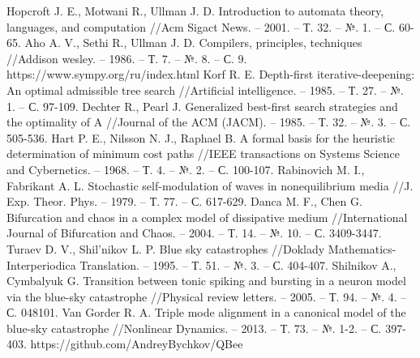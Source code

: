 \documentclass[a4paper,14pt]{article}
\begin{document}
\begin{thebibliography}{9}
 Hopcroft J. E., Motwani R., Ullman J. D. Introduction to automata theory, languages, and computation //Acm Sigact News. – 2001. – Т. 32. – №. 1. – С. 60-65.
 Aho A. V., Sethi R., Ullman J. D. Compilers, principles, techniques //Addison wesley. – 1986. – Т. 7. – №. 8. – С. 9.
 https://www.sympy.org/ru/index.html
 Korf R. E. Depth-first iterative-deepening: An optimal admissible tree search //Artificial intelligence. – 1985. – Т. 27. – №. 1. – С. 97-109.
 Dechter R., Pearl J. Generalized best-first search strategies and the optimality of A //Journal of the ACM (JACM). – 1985. – Т. 32. – №. 3. – С. 505-536.
 Hart P. E., Nilsson N. J., Raphael B. A formal basis for the heuristic determination of minimum cost paths //IEEE transactions on Systems Science and Cybernetics. – 1968. – Т. 4. – №. 2. – С. 100-107.
 Rabinovich M. I., Fabrikant A. L. Stochastic self-modulation of waves in nonequilibrium media //J. Exp. Theor. Phys. – 1979. – Т. 77. – С. 617-629.
 Danca M. F., Chen G. Bifurcation and chaos in a complex model of dissipative medium //International Journal of Bifurcation and Chaos. – 2004. – Т. 14. – №. 10. – С. 3409-3447.
 Turaev D. V., Shil'nikov L. P. Blue sky catastrophes //Doklady Mathematics-Interperiodica Translation. – 1995. – Т. 51. – №. 3. – С. 404-407.
 Shilnikov A., Cymbalyuk G. Transition between tonic spiking and bursting in a neuron model via the blue-sky catastrophe //Physical review letters. – 2005. – Т. 94. – №. 4. – С. 048101.
 Van Gorder R. A. Triple mode alignment in a canonical model of the blue-sky catastrophe //Nonlinear Dynamics. – 2013. – Т. 73. – №. 1-2. – С. 397-403.
 https://github.com/AndreyBychkov/QBee

\end{thebibliography}
\end{document}
